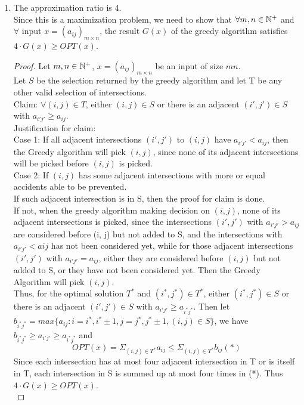 \documentclass[11pt]{article}
\begin{document}
\begin{enumerate}
\begin{enumerate}
    \item The approximation ratio is 4.\\
    Since this is a maximization problem, we need to show that $\forall m,n \in \mathbb N^+$ and $\forall$ input $x = (a_{ij})_{m\times n}$, the result $G(x)$ of the greedy algorithm satisfies $4 \cdot G(x) \geq OPT(x)$.\\
    \begin{proof}
         Let $m, n \in \mathbb N^+$, $x = (a_{ij})_{m\times n}$ be an input of size $mn$.\\
         Let $S$ be the selection returned by the greedy algorithm and let T be any other valid selection of intersections.\\[2ex]
         Claim:  $ \forall (i, j) \in T$, either $(i, j)\in S$ or there is an adjacent $(i', j') \in S$ with $a_{i'j'} \geq a_{ij}$.\\[2ex]
         Justification for claim: \\
         Case 1: If all adjacent intersections $(i', j')$ to $(i, j)$ have $a_{i'j'} < a_{ij}$, then the Greedy algorithm will pick $(i, j)$, since none of its adjacent intersections will be picked before $(i, j)$ is picked.\\
         Case 2: If $(i, j)$ has some adjacent intersections with more or equal accidents able to be prevented.\\
         If such adjacent intersection is in S, then the proof for claim is done.\\
         If not, when the greedy algorithm making decision on $(i, j)$, none of its adjacent intersections is picked, since the intersections $(i', j')$ with $a_{i'j'} > a_{ij}$ are considered before (i, j) but not added to S, and the intersections with $a_{i'j'} < a{ij}$ has not been considered yet, while for those adjacent intersections $(i', j')$ with $a_{i'j'} = a_{ij}$, either they are considered before $(i, j)$ but not added to S, or they have not been considered yet. Then the Greedy Algorithm will pick $(i, j)$.\\[2ex]
         
         Thus, for the optimal solution $T^*$ and $(i^*, j^*) \in T^*$, either $(i^*, j^*)\in S$ or there is an adjacent $(i', j') \in S$ with $a_{i'j'} \geq a_{i^*j^*}$. Then let $b_{i^*j^*} = max\{a_{ij}: i=i^*, i^*\pm 1, j= j^*, j^* \pm 1, (i, j) \in S\}$, we have  $b_{i^*j^*} \geq a_{i'j'} \geq a_{i^*j^*}$ and \\
         $$OPT(x) = \Sigma_{(i, j) \in T^*} a_{ij} \leq \Sigma_{(i, j) \in T^*} b_{ij} (*)$$
         Since each intersection has at most four adjacent intersection in T or is itself in T, each intersection in S is summed up at most four times in (*). Thus $4 \cdot G(x) \geq OPT(x)$.\\ 
    \end{proof}
    
    \end{enumerate}  
\end{enumerate}

  
\end{document}
